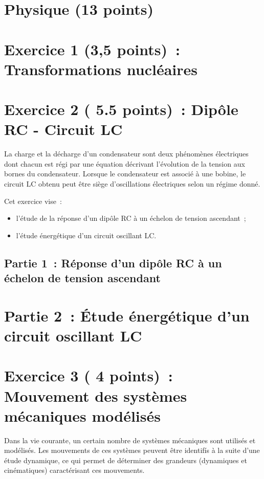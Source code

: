 \section*{Physique (13 points)}

\section*{Exercice 1 (3,5 points)~: Transformations nucléaires}


\section*{Exercice 2 ( 5.5 points)~: Dipôle RC - Circuit LC}
La charge et la décharge d'un condensateur sont deux phénomènes électriques dont
chacun est régi par une équation décrivant l'évolution de la tension aux bornes
du condensateur. Lorsque le condensateur est associé à une bobine, le circuit LC
obtenu peut être siège d'oscillations électriques selon un régime donné.

Cet exercice vise~:
\begin{itemize}
    \item l'étude de la réponse d'un dipôle RC à un échelon de tension
          ascendant~;
    \item l'étude énergétique d'un circuit oscillant LC.
\end{itemize}

\subsection*{Partie 1~: Réponse d'un dipôle RC à un échelon de tension ascendant}


\section*{Partie 2~: Étude énergétique d'un circuit oscillant LC}


\section*{Exercice 3 ( 4 points)~: Mouvement des systèmes mécaniques modélisés}
Dans la vie courante, un certain nombre de systèmes mécaniques sont utilisés et
modélisés. Les mouvements de ces systèmes peuvent être identifís à la suite
d'une étude dynamique, ce qui permet de déterminer des grandeurs (dynamiques et
cinématiques) caractérisant ces mouvements.

